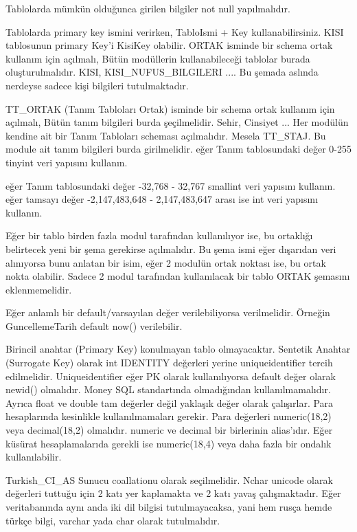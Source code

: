 \documentclass[10pt,a4paper,draft]{article}
\begin{document}
	 
  			Tablolarda mümkün olduğunca girilen bilgiler not null yapılmalıdır.
  		 
  			Tablolarda primary key ismini verirken, TabloIsmi + Key 
  kullanabilirsiniz. KISI tablosunun primary Key'i KisiKey olabilir.		 
  			ORTAK isminde bir schema ortak kullanım için açılmalı, Bütün modüllerin 
  kullanabileceği tablolar burada oluşturulmalıdır.			KISI, KISI\_NUFUS\_BILGILERI 
  .... Bu şemada aslında nerdeyse sadece kişi bilgileri tutulmaktadır.
  
  			TT\_ORTAK  (Tanım Tabloları Ortak) isminde bir schema ortak kullanım 
  için açılmalı, Bütün tanım bilgileri burda şeçilmelidir. 			Sehir, Cinsiyet 
  ...		 
  			Her modülün kendine ait bir Tanım Tabloları scheması açılmalıdır. 
  Mesela TT\_STAJ. Bu module ait tanım bilgileri burda girilmelidir. 		 
   eğer Tanım tablosundaki değer 0-255  tinyint veri yapısını kullanın.
  		 
   eğer Tanım tablosundaki değer  -32,768 - 32,767   smallint veri yapısını 
  kullanın.		 
   eğer tamsayı değer  -2,147,483,648 - 2,147,483,647 arası ise int veri 
  yapısını kullanın.		 
  
  
  			Eğer bir tablo birden fazla modul tarafından kullanılıyor ise, 
  bu ortaklığı belirtecek yeni bir şema gerekirse açılmalıdır. 
  Bu şema ismi eğer dışarıdan veri alınıyorsa bunu anlatan bir isim,
  eğer 2 modulün ortak noktası ise, bu ortak nokta olabilir.
  Sadece 2 modul tarafından kullanılacak bir tablo ORTAK şemasını eklenmemelidir.
  
  
  
  
  			Eğer anlamlı bir default/varsayılan değer verilebiliyorsa verilmelidir.
    Örneğin GuncellemeTarih default now() verilebilir.
  
  			Birincil anahtar (Primary Key) konulmayan tablo olmayacaktır.		 
  			Sentetik Anahtar (Surrogate Key) olarak int IDENTITY değerleri yerine 
  uniqueidentifier tercih edilmelidir.		 
  			Uniqueidentifier eğer PK olarak kullanılıyorsa default değer olarak 
  newid() olmalıdır.		 
  			 Money SQL standartında olmadığından kullanılmamalıdır. Ayrıca float ve 
  double tam değerler değil 			 yaklaşık değer olarak çalışırlar. Para 
  hesaplarında kesinlikle kullanılmamaları gerekir.		 
  			Para değerleri numeric(18,2) veya decimal(18,2) olmalıdır.	
  numeric ve decimal bir birlerinin alias'ıdır. 
    Eğer küsürat hesaplamalarıda gerekli ise numeric(18,4) veya daha fazla
    bir ondalık kullanılabilir.

  
  			Turkish\_CI\_AS Sunucu coallationu olarak seçilmelidir. Nchar unicode 
  olarak değerleri tuttuğu için 	2 katı yer kaplamakta ve 2 katı yavaş 
  çalışmaktadır. Eğer veritabanında aynı anda iki dil bilgisi tutulmayacaksa, 
  yani			hem rusça hemde türkçe bilgi,  varchar yada char olarak tutulmalıdır.
  		 
\end{document}
